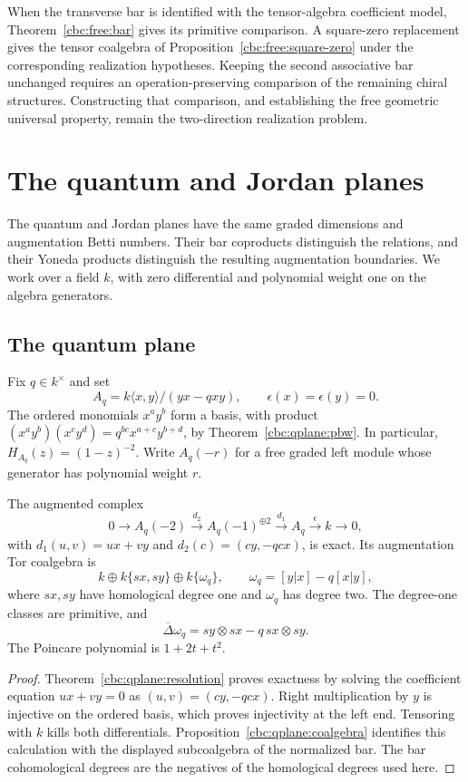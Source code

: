 When the transverse bar is identified with the tensor-algebra coefficient model, Theorem~\ref{cbc:free:bar} gives its primitive comparison.
A square-zero replacement gives the tensor coalgebra of Proposition~\ref{cbc:free:square-zero} under the corresponding realization hypotheses.
Keeping the second associative bar unchanged requires an operation-preserving comparison of the remaining chiral structures.
Constructing that comparison, and establishing the free geometric universal property, remain the two-direction realization problem.

\chapter{The quantum and Jordan planes}\label{chap:planes}

The quantum and Jordan planes have the same graded dimensions and augmentation Betti numbers.
Their bar coproducts distinguish the relations, and their Yoneda products distinguish the resulting augmentation boundaries.
We work over a field $k$, with zero differential and polynomial weight one on the algebra generators.

\section{The quantum plane}

Fix $q\in k^\times$ and set
\[
 A_q=k\langle x,y\rangle/(yx-qxy),\qquad
 \epsilon(x)=\epsilon(y)=0.
\]
The ordered monomials $x^ay^b$ form a basis, with product
$(x^ay^b)(x^cy^d)=q^{bc}x^{a+c}y^{b+d}$, by Theorem~\ref{cbc:qplane:pbw}.
In particular, $H_{A_q}(z)=(1-z)^{-2}$.
Write $A_q(-r)$ for a free graded left module whose generator has polynomial weight $r$.

\begin{theorem}\label{thm:qplane}
The augmented complex
\[
 0\longrightarrow A_q(-2)\xrightarrow{d_2}A_q(-1)^{\oplus2}
 \xrightarrow{d_1}A_q\xrightarrow{\epsilon}k\longrightarrow0,
\]
with $d_1(u,v)=ux+vy$ and $d_2(c)=(cy,-qcx)$, is exact.
Its augmentation Tor coalgebra is
\[
 k\oplus k\{sx,sy\}\oplus k\{\omega_q\},\qquad
 \omega_q=[y|x]-q[x|y],
\]
where $sx,sy$ have homological degree one and $\omega_q$ has degree two.
The degree-one classes are primitive, and
\[
 \overline\Delta\omega_q=sy\otimes sx-q\,sx\otimes sy.
\]
The Poincare polynomial is $1+2t+t^2$.
\end{theorem}
\begin{proof}
Theorem~\ref{cbc:qplane:resolution} proves exactness by solving the coefficient equation $ux+vy=0$ as $(u,v)=(cy,-qcx)$.
Right multiplication by $y$ is injective on the ordered basis, which proves injectivity at the left end.
Tensoring with $k$ kills both differentials.
Proposition~\ref{cbc:qplane:coalgebra} identifies this calculation with the displayed subcoalgebra of the normalized bar.
The bar cohomological degrees are the negatives of the homological degrees used here.
\end{proof}

